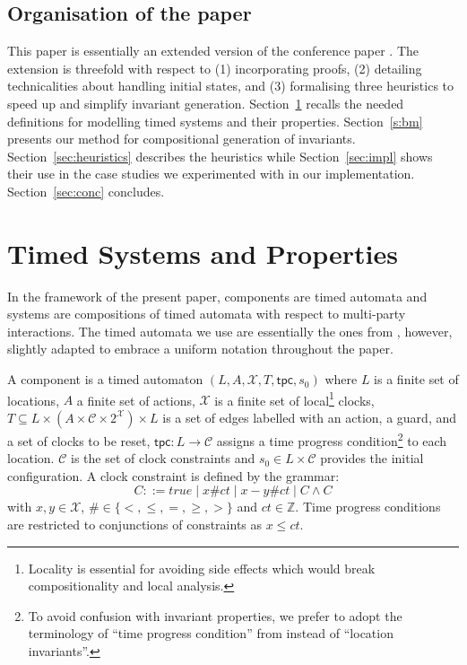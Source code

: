 \documentclass{LMCS}
\newcommand{\X}{\mathcal{X}}
\newcommand{\inv}{\mathsf{tpc}}
\newcommand{\true}{\mathit{true}\xspace}
\theoremstyle{plain}\newtheorem{remark}[thm]{Remark}
\theoremstyle{plain}\newtheorem{example}[thm]{Example}
\begin{document}
\subsection*{Organisation of the paper}  
This paper is essentially an extended version of the conference paper
\cite{abbbc14}. The extension is threefold with respect to (1)
incorporating proofs, (2) detailing technicalities about handling
initial states, and (3) formalising three heuristics to speed up and
simplify invariant generation. Section~\ref{sec:frtbip} recalls the
needed definitions for modelling timed systems and their
properties. Section~\ref{s:bm} presents our method for compositional
generation of invariants. Section~\ref{sec:heuristics} describes the
heuristics while Section~\ref{sec:impl} shows their use in the case
studies we experimented with in our
implementation. Section~\ref{sec:conc} concludes.



\section{Timed Systems and Properties}
\label{sec:frtbip}
In the framework of the present paper, components are timed automata and
systems are compositions of timed automata with respect to multi-party
interactions. The timed automata we use are essentially the ones from
\cite{alur94}, however, slightly adapted to embrace a uniform notation
throughout the paper.

\begin{defi}[Syntax]
  A component is a timed automaton $(L, A, \X, T, \inv, s_0)$ where
  $L$ is a finite set of locations, $A$ a finite set of actions, $\X$
  is a finite set of local\footnote{Locality is essential for avoiding
    side effects which would break compositionality and local
    analysis.}  clocks, $T \subseteq L\times(A\times \mathcal C\times
  2^{\X})\times L$ is a set of edges labelled with an action, a guard,
  and a set of clocks to be reset, $\inv: L\rightarrow {\mathcal C}$
  assigns a time progress condition\footnote{To avoid confusion with
    invariant properties, we prefer to adopt the terminology of ``time
    progress condition'' from \cite{bornot98} instead of ``location
    invariants''.} to each location.  $\mathcal C$ is the set of clock
  constraints and $s_0 \in L \times {\mathcal C}$ provides the initial
  configuration. A clock constraint is defined by the grammar:
  \[ C ::= \true \mid x\#\mathit{ct} \mid x - y \#\mathit{ct}
  \mid C \wedge C \] with $x, y\in \X$, $\#\in\{<,\le,=,\ge,>\}$ and
  $\mathit{ct} \in \mathbb{Z}$.  Time progress conditions are restricted to
  conjunctions of constraints as $x \leq \mathit{ct}$.
\end{defi}
\end{document}
